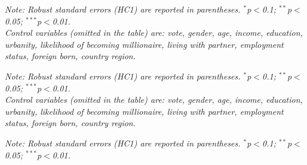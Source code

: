 \begin{table}[!htbp] 
  \caption[Warm glow: substitute]{Effect of a \textit{Donation lottery} treatment on support for the Global Climate Scheme. (Questions~\ref{q:donation}-\ref{q:gcs_support})\hfill (Back~to~Section~\ref{subsec:warm_glow}.)}\label{tab:warm_glow_substitute} 
  \makebox[\textwidth][c]{\resizebox{.98\paperwidth}{!}{}}
  {\small \textit{Note: Robust standard errors (HC1) are reported in parentheses. \hfill $^{*}$p$<$0.1; $^{**}$p$<$0.05; $^{***}$p$<$0.01.\\ Control variables (omitted in the table) are: vote, gender, age, income, education, urbanity, likelihood of becoming millionaire, living with partner, employment status, foreign born, country region.}}
\end{table}

\begin{table}[!htbp] 
  \caption[Warm glow: realism]{Effect of information about ongoing global redistribution initiatives on the share of plausible global policies supported. (Questions~\ref{q:info_solidarity}-\ref{q:solidarity_support}).\hfill (Back~to~Section~\ref{subsec:warm_glow}.)}\label{tab:warm_glow_realism} 
  \makebox[\textwidth][c]{\resizebox{.98\paperwidth}{!}{}}
  {\small \textit{Note: Robust standard errors (HC1) are reported in parentheses. \hfill $^{*}$p$<$0.1; $^{**}$p$<$0.05; $^{***}$p$<$0.01. \\ Control variables (omitted in the table) are: vote, gender, age, income, education, urbanity, likelihood of becoming millionaire, living with partner, employment status, foreign born, country region.}}
\end{table}

\begin{table}[!htbp] 
  \caption[Warm glow: IV without control]{Effect on support for global redistribution of believing that it is likely, without control\hfill (Back~to~Section~\ref{subsec:warm_glow}.)}\label{tab:iv_wo_control} 
  \makebox[\textwidth][c]{} %
  {\small \textit{Note: Robust standard errors (HC1) are reported in parentheses. \hfill $^{*}$p$<$0.1; $^{**}$p$<$0.05; $^{***}$p$<$0.01.  %
  }}
\end{table}
